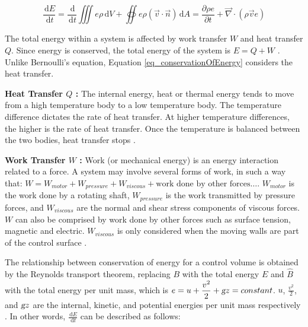 \documentclass{article}
\newcommand{\ud}{\,\mathrm{d}}
\begin{document}
\begin{equation}
\frac{\ud E}{\ud t} = \frac{\ud}{\ud t} \iiint e \rho \ud V + \oiint e \rho (\vec{v} \cdot \vec{n}) \ud A = \frac{\partial \rho e}{ \partial t} + \vec{\nabla} \cdot (\rho \vec{v} e)
\label{eq_conservationOfEnergy}
\end{equation}

The total energy within a system is affected by work transfer $W$ and heat transfer $Q$. Since energy is conserved, the total energy of the system is $\displaystyle E = Q + W$ \cite{Moukalled2016, White2011}. Unlike Bernoulli's equation, Equation \ref{eq_conservationOfEnergy} considers the heat transfer.

\textbf{Heat Transfer $Q$ :} The internal energy, heat or thermal energy tends to move from a high temperature body to a low temperature body. The temperature difference dictates the rate of heat transfer. At higher temperature differences, the higher is the rate of heat transfer. Once the temperature is balanced between the two bodies, heat transfer stops \cite{White2011}.

\textbf{Work Transfer $W$ :} Work (or mechanical energy) is an energy interaction related to a force. A system may involve several forms of work, in such a way that: $\displaystyle W = W_{motor} + W_{pressure} + W_{viscous} + \textrm{work done by other forces} \dots$. $W_{motor}$ is the work done by a rotating shaft,  $W_{pressure}$ is the work transmitted by pressure forces, and $W_{viscous}$ are the normal and shear stress components of viscous forces. $W$ can also be comprised by work done by other forces such as surface tension, magnetic and electric. $W_{viscous}$ is only considered when the moving walls are part of the control surface \cite{White2011}.

The relationship between conservation of energy for a control volume is obtained by the Reynolds transport theorem, replacing $B$ with the total energy $E$ and $\hat{B}$ with the total energy per unit mass, which is $e = \displaystyle u + \frac{v^2}{2} + \textsl{g} z = constant$. $u$, $\displaystyle \frac{v^2}{2}$, and $\textsl{g} z$ are the internal, kinetic, and potential energies per unit mass respectively \cite{Moukalled2016, White2011}. In other words, $\displaystyle \frac{\ud E}{\ud t}$ can be described as follows:
\end{document}
